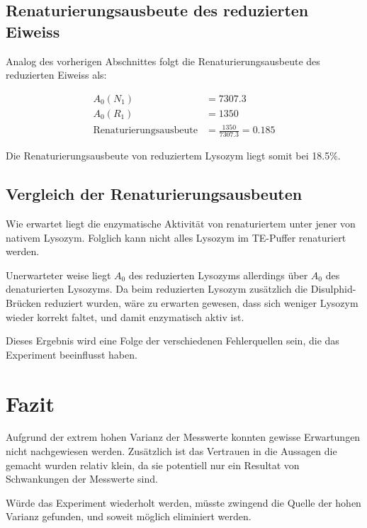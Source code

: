 \documentclass[a4paper,german]{scrreprt}
\begin{document}
\section{Renaturierungsausbeute des reduzierten Eiweiss}

Analog des vorherigen Abschnittes folgt die Renaturierungsausbeute des
reduzierten Eiweiss als:

\begin{align*}
	A_0(N_1) & = 7307.3 \\
	A_0(R_1) & = 1350 \\
	\text{Renaturierungsausbeute} & = \frac{1350}{7307.3} = 0.185
\end{align*}

Die Renaturierungsausbeute von reduziertem Lysozym liegt somit bei 18.5\%.

\section{Vergleich der Renaturierungsausbeuten}

Wie erwartet liegt die enzymatische Aktivität von renaturiertem unter jener von
nativem Lysozym. Folglich kann nicht alles Lysozym im TE-Puffer renaturiert
werden.

Unerwarteter weise liegt $A_0$ des reduzierten Lysozyms allerdings über $A_0$
des denaturierten Lysozyms. Da beim reduzierten Lysozym zusätzlich die
Disulphid-Brücken reduziert wurden, wäre zu erwarten gewesen, dass sich weniger
Lysozym wieder korrekt faltet, und damit enzymatisch aktiv ist.

Dieses Ergebnis wird eine Folge der verschiedenen Fehlerquellen sein, die das
Experiment beeinflusst haben.

\chapter{Fazit}

Aufgrund der extrem hohen Varianz der Messwerte konnten gewisse Erwartungen
nicht nachgewiesen werden. Zusätzlich ist das Vertrauen in die Aussagen die
gemacht wurden relativ klein, da sie potentiell nur ein Resultat von
Schwankungen der Messwerte sind.

Würde das Experiment wiederholt werden, müsste zwingend die Quelle der hohen
Varianz gefunden, und soweit möglich eliminiert werden.



\end{document}
